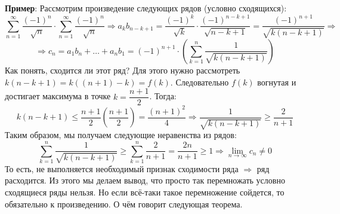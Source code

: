 \documentclass[12pt]{article}
\theoremstyle{definition}
\DeclareMathOperator*{\dsum}{\displaystyle\sum}
\begin{document}
\textbf{Пример}: Рассмотрим произведение следующих рядов (условно сходящихся):
$$
	\dsum\limits_{n = 1}^{\infty}\dfrac{(-1)^n}{\sqrt{n}}{\cdot}\dsum\limits_{n = 1}^{\infty}\dfrac{(-1)^n}{\sqrt{n}} \Rightarrow a_k b_{n - k + 1} =\dfrac{(-1)^k}{\sqrt{k}}{\cdot}\dfrac{(-1)^{n- k + 1}}{\sqrt{n - k +1 }} = \dfrac{(-1)^{n+1}}{\sqrt{k(n - k + 1)}} \Rightarrow
$$
$$
	\Rightarrow c_n = a_1 b_n + \dotsc + a_n b_1 = (-1)^{n+1}{\cdot}\left(\dsum\limits_{k = 1}^n\dfrac{1}{\sqrt{k(n - k + 1)}}\right)
$$
Как понять, сходится ли этот ряд? Для этого нужно рассмотреть $k(n-k + 1) = k((n+1) - k) =f(k)$. Следовательно $f(k)$ вогнутая и достигает максимума в точке $k = \dfrac{n+1}{2}$. Тогда: 
$$
	k(n - k + 1) \leq \dfrac{n+1}{2}\left(\dfrac{n+1}{2}\right) = \dfrac{(n+1)^2}{4} \Rightarrow \dfrac{1}{\sqrt{k(n-k+1)}} \geq \dfrac{2}{n + 1}
$$
Таким образом, мы получаем следующие неравенства из рядов:
$$
	\dsum\limits_{k = 1}^{n} \dfrac{1}{\sqrt{k(n - k + 1)}} \geq \dsum\limits_{k = 1}^{n} \dfrac{2}{n+1} = \dfrac{2n}{n + 1} \geq 1 \Rightarrow \lim\limits_{n \to \infty} c_n  \neq 0
$$
То есть, не выполняется необходимый признак сходимости ряда $\Rightarrow$ ряд расходится. Из этого мы делаем вывод, что просто так перемножать условно сходящиеся ряды нельзя. Но если всё-таки такое перемножение сойдется, то обязательно к произведению. О чём говорит следующая теорема.
\end{document}
